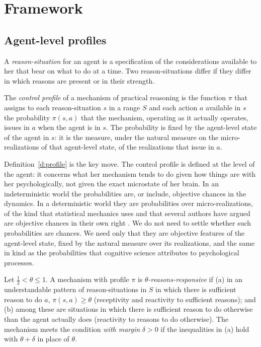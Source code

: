 \documentclass{situationist-preprint}
\begin{document}
\section{Framework}\label{s:frame}

\subsection{Agent-level profiles}

\begin{definition}\label{d:sit}
A \emph{reason-situation} for an agent is a specification of the considerations available to her that bear on what to do at a time. Two reason-situations differ if they differ in which reasons are present or in their strength.
\end{definition}

\begin{definition}\label{d:profile}
The \emph{control profile} of a mechanism of practical reasoning is the function $\pi$ that assigns to each reason-situation $s$ in a range $S$ and each action $a$ available in $s$ the probability $\pi(s,a)$ that the mechanism, operating as it actually operates, issues in $a$ when the agent is in $s$. The probability is fixed by the agent-level state of the agent in $s$: it is the measure, under the natural measure on the micro-realizations of that agent-level state, of the realizations that issue in $a$.
\end{definition}

Definition~\ref{d:profile} is the key move. The control profile is defined at the level of the agent: it concerns what her mechanism tends to do given how things are with her psychologically, not given the exact microstate of her brain. In an indeterministic world the probabilities are, or include, objective chances in the dynamics. In a deterministic world they are probabilities over micro-realizations, of the kind that statistical mechanics uses and that several authors have argued are objective chances in their own right \citep{Loewer2001,Glynn2010}. We do not need to settle whether such probabilities are chances. We need only that they are objective features of the agent-level state, fixed by the natural measure over its realizations, and the same in kind as the probabilities that cognitive science attributes to psychological processes.

\begin{definition}\label{d:rr}
Let $\tfrac12 < \theta \leq 1$. A mechanism with profile $\pi$ is \emph{$\theta$-reasons-responsive} if (a) in an understandable pattern of reason-situations in $S$ in which there is sufficient reason to do $a$, $\pi(s,a) \geq \theta$ (receptivity and reactivity to sufficient reasons); and (b) among these are situations in which there is sufficient reason to do otherwise than the agent actually does (reactivity to reasons to do otherwise). The mechanism meets the condition \emph{with margin} $\delta > 0$ if the inequalities in (a) hold with $\theta + \delta$ in place of $\theta$.
\end{definition}
\end{document}
